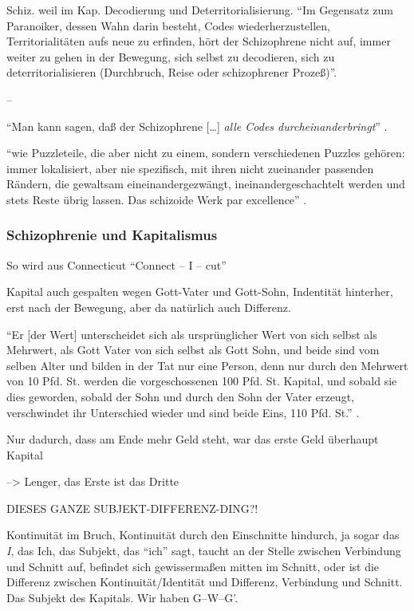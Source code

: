 \documentclass[12pt,
               DIV13,
               paper=a4,
               twoside=false,
               onehalfspacing,
               bibliography=totoc,
               toc=graduated,
               draft,
               ]{scrartcl}
\newcommand{\lips}{\dots\unkern}
\newcommand{\pc}[2]{\parencite[#1]{#2}}
\newcommand{\gwg}{G--W--G'\xspace}
\begin{document}
Schiz. weil im Kap. Decodierung und Deterritorialisierung. "`Im
Gegensatz zum Paranoiker, dessen Wahn darin besteht, Codes
wiederherzustellen, Territorialitäten aufs neue zu erfinden, hört der
Schizophrene nicht auf, immer weiter zu gehen in der Bewegung, sich
selbst zu decodieren, sich zu deterritorialisieren (Durchbruch, Reise
oder schizophrener Prozeß)"'\pc{28}{schizg}.

--

"`Man kann sagen, daß der Schizophrene [\lips] \emph{alle Codes
durcheinanderbringt}"' \pc{22}{ao}.

"`wie Puzzleteile, die aber nicht zu einem, sondern verschiedenen
Puzzles gehören: immer lokalisiert, aber nie spezifisch, mit ihren
nicht zueinander passenden Rändern, die gewaltsam eineinandergezwängt,
ineinandergeschachtelt werden und stets Reste übrig lassen. Das
schizoide Werk par excellence"' \pc{54}{ao}.

\subsubsection{Schizophrenie und Kapitalismus}

So wird aus Connecticut "`Connect -- I -- cut"' \pc{48}{ao}

Kapital auch gespalten wegen Gott-Vater und Gott-Sohn, Indentität
hinterher, erst nach der Bewegung, aber da natürlich auch Differenz.

"`Er [der Wert] unterscheidet sich als ursprünglicher Wert von sich
selbst als Mehrwert, als Gott Vater von sich selbst als Gott Sohn, und
beide sind vom selben Alter und bilden in der Tat nur eine Person,
denn nur durch den Mehrwert von 10 Pfd. St. werden die vorgeschossenen
100 Pfd. St. Kapital, und sobald sie dies geworden, sobald der Sohn
und durch den Sohn der Vater erzeugt, verschwindet ihr Unterschied
wieder und sind beide Eins, 110 Pfd. St."' \pc{S. 169 f.}{kap}.

Nur dadurch, dass am Ende mehr Geld steht, war das erste Geld
überhaupt Kapital

--> Lenger, das Erste ist das Dritte

DIESES GANZE SUBJEKT-DIFFERENZ-DING?!

Kontinuität im Bruch, Kontinuität durch den Einschnitte hindurch, ja
sogar das \emph{I}, das Ich, das Subjekt, das "`ich"' sagt, taucht an
der Stelle zwischen Verbindung und Schnitt auf, befindet sich
gewissermaßen mitten im Schnitt, oder ist die Differenz zwischen
Kontinuität/Identität und Differenz, Verbindung und Schnitt. Das
Subjekt des Kapitals. Wir haben \gwg.
\end{document}
